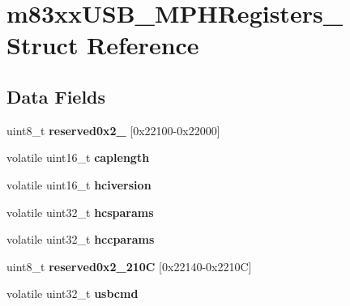 \hypertarget{structm83xxUSB__MPHRegisters__}{}\section{m83xx\+U\+S\+B\+\_\+\+M\+P\+H\+Registers\+\_\+ Struct Reference}
\label{structm83xxUSB__MPHRegisters__}
\subsection*{Data Fields}
\begin{DoxyCompactItemize}
\item 
\mbox{\label{structm83xxUSB__MPHRegisters___a4e869fbd71778e129aee15ed5932aa6d}} 
uint8\+\_\+t {\bfseries reserved0x2\+\_} \mbox{[}0x22100-\/0x22000\mbox{]}
\item 
\mbox{\label{structm83xxUSB__MPHRegisters___acd1999503d3421670c68a58a1d69e148}} 
volatile uint16\+\_\+t {\bfseries caplength}
\item 
\mbox{\label{structm83xxUSB__MPHRegisters___a368e7467463aa093543dfa5d3c98ee1f}} 
volatile uint16\+\_\+t {\bfseries hciversion}
\item 
\mbox{\label{structm83xxUSB__MPHRegisters___afa6a505314de62c083b3973d691811af}} 
volatile uint32\+\_\+t {\bfseries hcsparams}
\item 
\mbox{\label{structm83xxUSB__MPHRegisters___a2d4466471457dd79c77ff982358e30c5}} 
volatile uint32\+\_\+t {\bfseries hccparams}
\item 
\mbox{\label{structm83xxUSB__MPHRegisters___a8309fafd1b1ce03567a41e5614fb80b3}} 
uint8\+\_\+t {\bfseries reserved0x2\+\_\+210C} \mbox{[}0x22140-\/0x2210\+C\mbox{]}
\item 
\mbox{\label{structm83xxUSB__MPHRegisters___a1ae7187aa12ca224e7f02e5254b50c34}} 
volatile uint32\+\_\+t {\bfseries usbcmd}
\item 
\mbox{\label{structm83xxUSB__MPHRegisters___a19659380469f2897d12b8c97912cf8cd}} 

\end{DoxyCompactItemize}
